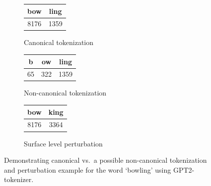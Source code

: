 \begin{figure}[h]
\centering

\begin{subfigure}[t]{0.45\textwidth}
\centering
\begin{tabular}{|c|c|}
\hline
\textbf{bow} & \textbf{ling} \\
\hline
8176 & 1359 \\
\hline
\end{tabular}
\caption{Canonical tokenization}
\end{subfigure}

\begin{subfigure}[t]{0.45\textwidth}
\centering
\begin{tabular}{|c|c|c|}
\hline
\textbf{b} & \textbf{ow} & \textbf{ling} \\
\hline
65 & 322 & 1359 \\
\hline
\end{tabular}
\caption{Non-canonical tokenization}
\end{subfigure}

\begin{subfigure}[t]{0.45\textwidth}
\centering
\begin{tabular}{|c|c|}
\hline
\textbf{bow} & \textbf{king} \\
\hline
8176 & 3364 \\
\hline
\end{tabular}
\caption{Surface level perturbation}
\end{subfigure}


\caption{Demonstrating canonical vs.\ a possible non-canonical tokenization and perturbation example for the word `bowling' using GPT2-tokenizer.}
\label{fig:noncanon}
\end{figure}
